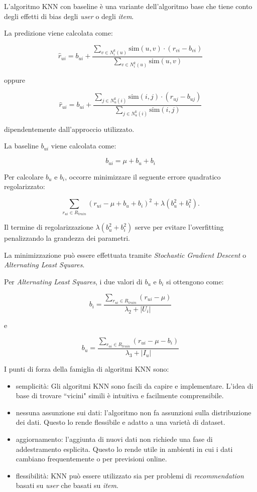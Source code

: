 L'algoritmo KNN con baseline \cite{KNN_baseline} è una variante dell'algoritmo base che tiene conto degli effetti di bias degli \textit{user} o degli \textit{item}.

La predizione viene calcolata come:

\[
\hat{r}_{ui} = b_{ui} + \frac{\sum\limits_{v \in N^k_i(u)} \text{sim}(u, v) \cdot (r_{vi} - b_{vi})}{\sum\limits_{v \in N^k_i(u)} \text{sim}(u, v)}
\]

oppure

\[
\hat{r}_{ui} = b_{ui} + \frac{\sum\limits_{j \in N^k_u(i)} \text{sim}(i, j) \cdot (r_{uj} - b_{uj})}{\sum\limits_{j \in N^k_u(i)} \text{sim}(i, j)}
\]

dipendentemente dall'approccio utilizzato.

La baseline $b_{ui}$ viene calcolata come:

\[
b_{ui} = \mu + b_u + b_i
\]

Per calcolare $b_u$ e $b_i$, occorre minimizzare il seguente errore quadratico regolarizzato:

\[
\sum\limits_{r_{ui} \in R_{train}} \left(r_{ui} - \mu + b_u + b_i\right)^2 + \lambda \left(b_u^2 + b_i^2 \right).
\]

Il termine di regolarizzazione $\lambda \left(b_u^2 + b_i^2 \right)$ serve per evitare l'overfitting penalizzando la grandezza dei parametri.

La minimizzazione può essere effettuata tramite \textit{Stochastic Gradient Descent} o \textit{Alternating Least Squares}.

Per \textit{Alternating Least Squares}, i due valori di $b_u$ e $b_i$ si ottengono come:

\[
b_i = \frac{\sum\limits_{r_{ui} \in R_{train}} (r_{ui} - \mu)}{\lambda_2 + |U_i|}
\]

e

\[
b_u = \frac{\sum\limits_{r_{ui} \in R_{train}} (r_{ui} - \mu - b_i)}{\lambda_3 + |I_u|}
\]

I punti di forza della famiglia di algoritmi KNN sono:
\begin{itemize}
    \item semplicità: Gli algoritmi KNN sono facili da capire e implementare. L'idea di base di trovare ``vicini" simili è intuitiva e facilmente comprensibile.
    \item nessuna assunzione sui dati: l'algoritmo non fa assunzioni sulla distribuzione dei dati. Questo lo rende flessibile e adatto a una varietà di dataset.
    \item aggiornamento: l'aggiunta di nuovi dati non richiede una fase di addestramento esplicita. Questo lo rende utile in ambienti in cui i dati cambiano frequentemente o per previsioni online.
    \item flessibilità: KNN può essere utilizzato sia per problemi di \textit{recommendation} basati su \textit{user} che basati su \textit{item}.
\end{itemize}

